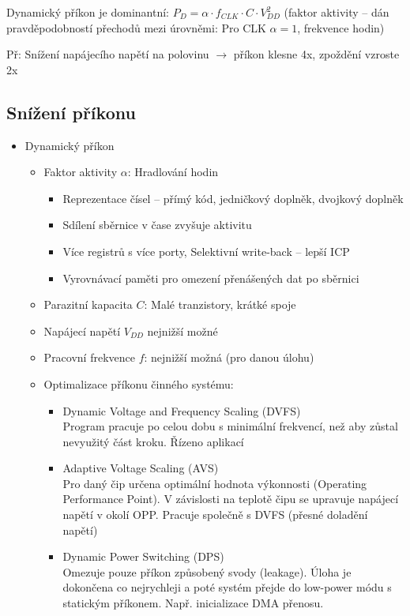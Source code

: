 \documentclass[a4paper, 11pt]{report}
\begin{document}
Dynamický příkon je dominantní: $P_D = \alpha \cdot f_{CLK} \cdot C \cdot V_{DD}^2$ (faktor aktivity -- dán pravděpodobností přechodů mezi úrovněmi: Pro CLK $\alpha = 1$, frekvence hodin)

Př: Snížení napájecího napětí na polovinu $\rightarrow$ příkon klesne 4x, zpoždění vzroste 2x

\subsection{Snížení příkonu}
\begin{itemize}
	\item Dynamický příkon
	\begin{itemize}
		\item Faktor aktivity $\alpha$: Hradlování hodin
		\begin{itemize}
			\item Reprezentace čísel -- přímý kód, jedničkový doplněk, dvojkový doplněk
			\item Sdílení sběrnice v čase zvyšuje aktivitu
			\item Více registrů s více porty, Selektivní write-back -- lepší ICP
			\item Vyrovnávací paměti pro omezení přenášených dat po sběrnici
		\end{itemize}
		\item Parazitní kapacita $C$: Malé tranzistory, krátké spoje
		\item Napájecí napětí $V_{DD}$ nejnižší možné
		\item Pracovní frekvence $f$: nejnižší možná (pro danou úlohu)
		\item Optimalizace příkonu činného systému:
		\begin{itemize}
			\item Dynamic Voltage and Frequency Scaling (DVFS)\\
			Program pracuje po celou dobu s minimální frekvencí, než aby zůstal nevyužitý část kroku. Řízeno aplikací
			\item Adaptive Voltage Scaling (AVS)\\
			Pro daný čip určena optimální hodnota výkonnosti (Operating Performance Point). V závislosti na teplotě čipu se upravuje napájecí napětí v okolí OPP. Pracuje společně s DVFS (přesné doladění napětí)
			\item Dynamic Power Switching (DPS)\\
			Omezuje pouze příkon způsobený svody (leakage). Úloha je dokončena co nejrychleji a poté systém přejde do low-power módu s  statickým příkonem. Např. inicializace DMA přenosu.

\end{itemize}
\end{itemize}
\end{itemize}
\end{document}
